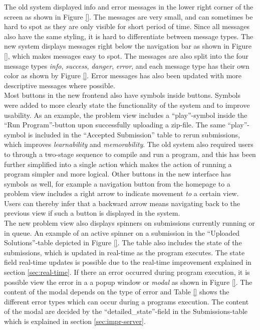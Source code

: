 The old system displayed info and error messages in the lower right corner of the screen as shown in Figure \ref{}. The messages are very small, and can sometimes be hard to spot as they are only visible for short period of time. Since all messages also have the same styling, it is hard to differentiate between message types. The new system displays messages right below the navigation bar as shown in Figure \ref{}, which makes messages easy to spot. The messages are also split into the four message types \textit{info}, \textit{success}, \textit{danger}, \textit{error}, and each message type has their own color as shown by Figure \ref{}. Error messages has also been updated with more descriptive messages where possible. \\

Most buttons in the new frontend also have symbols inside buttons. Symbols were added to more clearly state the functionality of the system and to improve usability. As an example, the problem view includes a ``play''-symbol inside the ``Run Program''-button upon successfully uploading a zip-file. The same ``play''-symbol is included in the ``Accepted Submission'' table to rerun submissions, which improves \textit{learnability} and \textit{memorability}. The old system also required users to through a two-stage sequence to compile and run a program, and this has been further simplified into a single action which makes the action of running a program simpler and more logical. Other buttons in the new interface has symbols as well, for example a navigation button from the homepage to a problem view includes a right arrow to indicate movement \textit{to} a certain view. Users can thereby infer that a backward arrow means navigating back to the previous view if such a button is displayed in the system. \\

The new problem view also displays spinners on submissions currently running or in queue. An example of an active spinner on a submission in the ``Uploaded Solutions''-table depicted in Figure \ref{}. The table also includes the state of the submissions, which is updated in real-time as the program executes. The state field real-time updates is possible due to the real-time improvement explained in section \ref{sec:real-time}. If there an error occurred during program execution, it is possible view the error in a a popup window or \textit{modal} as shown in Figure \ref{}. The content of the modal depends on the type of error and Table \ref{} shows the different error types which can occur during a programs execution. The content of the modal are decided by the ``detailed\_state''-field in the Submissions-table which is explained in section \ref{sec:impr-server}. \\

